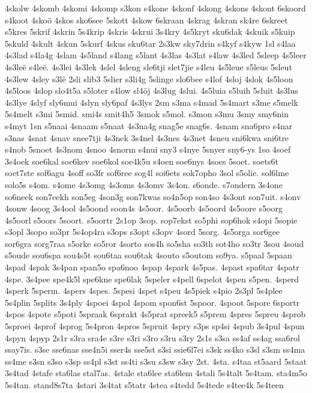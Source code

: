 4skolw
4skomb
4skomi
4skomp
s3kon
s4kone
4skonf
4skong
4skons
4skont
6skoord
s4koot
4skoö
4skos
sko6see
5skott
4skow
6skraan
4skrag
4skran
sk4re
6skreet
s5kres
5skrif
4skrin
5s4krip
4skris
4skrui
3s4kry
4s5kryt
sku6dak
4skuik
s5kuip
5skuld
4skult
4skun
5skurf
4skus
sku6tar
2s3kw
sky7drin
s4kyf
s4kyw
1sl
s4laa
4s3lad
s4la4g
4slam
4s5land
s4lang
s5lant
4s3las
4s3lat
s4law
4s3led
5sleep
4s5leer
4s3leë
s4leë.
4s3lei
4s3lek
4slel
4sleng
sle6tji
slet7jie
s4leu
4s5leue
s5leus
5sleut
4s3lew
4sley
s3lê
2sli
slib3
5slier
s3li4g
5slinge
slo6bee
s4lof
4sloj
4slok
4s5loon
4s5loos
4slop
slo4t5a
s5loter
s4low
sl4öj
4s3lug
4slui.
4s5luia
s5luih
5sluit
4s3lus
4s3lye
4slyf
sly6mui
4slyn
sly6paf
4s3lys
2sm
s3ma
s4mad
5s4mart
s3me
s5melk
5s4melt
s3mi
5smid.
smi4s
smit4h5
3smok
s5mol.
s3mon
s3mu
3smy
smy6nin
s4myt
1sn
s5naai
4snaam
s5naat
4s3na4g
snag5e
snag6s.
4snam
sna6pro
s4nar
s3nas
4snat
4snav
snee7tji
4s3nek
3s4nel
4s3nes
4s3net
4sneu
sni6kwa
sni6tre
s4nob
5snoet
4s3nom
4snoo
4snorm
s4nui
sny3
s4nye
5snyer
sny6-ys
1so
4soef
3s4oek
soe6kal
soe6kev
soe6kol
soe4k5u
s4oen
soe6nys
4soes
5soet.
soets6t
soet7ste
sof6agu
4soff
so3fr
sof6ree
sog4l
soi6ets
sok7opho
3sol
s5olie.
sol6lme
solo5s
s4om.
s4ome
4s3omg
4s3oms
4s3omv
3s4on.
s6onde.
s7ondern
3s4one
so6neek
son7eekh
son5eg
4son3g
son7kwas
so4n5op
son4so
4s3ont
son7uit.
s4onv
4sonw
4soog
3s4ool
4s5oond
soon4s
4s5oor.
4s5oorb
4s5oord
4s5oore
s5oorg
4s5oorl
s5oors
5soort.
s5oortr
2s1op
3sop.
sop7ekst
so5phi
sop6hok
s4opi
5sopie
s3opl
3sopo
so3pr
5s4op4ra
s3ops
s3opt
s3opv
4sord
5sorg.
4s5orga
sor6gee
sor6gra
sorg7raa
s5orke
so5ror
4sorto
sos4h
so5sha
so3th
sot4ho
so3tr
3sou
4soud
s5oude
sou6spa
sou4s5t
sou6taa
sou6tak
4souto
s5outom
so9ya.
s5paal
5spaan
4spad
4spak
3s4pan
span5o
spa6noo
4spap
4spark
4s5pas.
4spast
spa6tar
4spatr
4spe.
3s4pee
spe4k5l
spe6kne
spe6lak
5speler
s4pell
6spelot
4spen
s5pen.
4sperd
4sperk
5sperm.
4spers
4spes.
5spesi
4spet
s4peu
4s5piek
s4pio
2s3pl
5s4plee
5s4plin
5splits
3s4ply
4spoei
4spol
4spom
spon6st
5spoor.
4spoot
5spore
6sportr
4spos
4spote
s5poti
5spraak
6sprakt
4s5prat
spreek5
s5prem
4spres
5spreu
4sprob
5sproei
4sprof
4sprog
5s4pron
4spros
5spruit
4spry
s3ps
sp4si
4spub
3s4pul
4spun
4spyn
4spyp
2s1r
s3ra
sra4e
s3re
s3ri
s3ro
s3ru
s3ry
2s1s
s3sa
ss4af
ss4ag
ssa6rol
ssay7is.
s3se
sse6nas
sse4n5i
sser4s
sse5st
s3si
ssie6l7ei
s3sk
ss4ko
s3sl
s3sm
ss4ma
ss4me
s3sn
s3so
s3sp
ss4pl
s3st
ss4ti
s3su
s3sw
s3sy
2st.
4sta.
s4taa
st5aard
5staat
3s4tad
4stafe
sta6las
stal7as.
4stale
sta6lee
sta6lem
4stali
5s4talt
5s4tam.
sta4m5o
5s4tan.
stand8s7ta
4stari
3s4tat
s5tatr
4stea
s4tedd
5s4tede
s4tee4k
5s4teen
